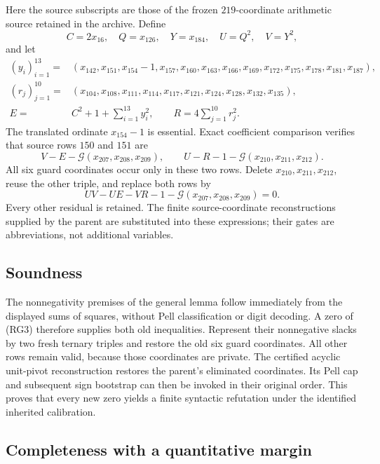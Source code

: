 Here the source subscripts are those of the frozen $219$-coordinate
arithmetic source retained in the archive. Define
\[
 C=2x_{16},\quad Q=x_{126},\quad Y=x_{184},\quad
 U=Q^2,\quad V=Y^2,
\]
and let
\begin{align*}
 (y_i)_{i=1}^{13}={}&(x_{142},x_{151},x_{154}-1,x_{157},x_{160},x_{163},
 x_{166},x_{169},x_{172},x_{175},x_{178},x_{181},x_{187}),\\
 (r_j)_{j=1}^{10}={}&(x_{104},x_{108},x_{111},x_{114},x_{117},
 x_{121},x_{124},x_{128},x_{132},x_{135}),\\
 E={}&C^2+1+\sum_{i=1}^{13}y_i^2,
 \qquad R=4\sum_{j=1}^{10}r_j^2.
\end{align*}
The translated ordinate $x_{154}-1$ is essential. Exact coefficient
comparison verifies that source rows $150$ and $151$ are
\[
 V-E-\mathcal G(x_{207},x_{208},x_{209}),\qquad
 U-R-1-\mathcal G(x_{210},x_{211},x_{212}).
\]
All six guard coordinates occur only in these two rows. Delete
$x_{210},x_{211},x_{212}$, reuse the other triple, and replace both rows by
\[
 \boxed{UV-UE-VR-1-\mathcal G(x_{207},x_{208},x_{209})=0.} \tag{RG3}
\]
Every other residual is retained. The finite source-coordinate
reconstructions supplied by the parent are substituted into these
expressions; their gates are abbreviations, not additional variables.

\subsection{Soundness}

The nonnegativity premises of the general lemma follow immediately from
the displayed sums of squares, without Pell classification or digit
decoding. A zero of (RG3) therefore supplies both old inequalities.
Represent their nonnegative slacks by two fresh ternary triples and
restore the old six guard coordinates. All other rows remain valid,
because those coordinates are private. The certified acyclic unit-pivot
reconstruction restores the parent's eliminated coordinates. Its Pell
cap and subsequent sign bootstrap can then be invoked in their original
order. This proves that every new zero yields a finite syntactic
refutation under the identified inherited calibration.

\subsection{Completeness with a quantitative margin}

